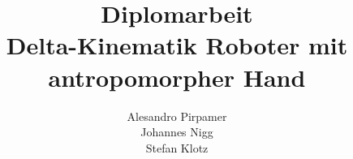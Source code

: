 \documentclass[a4paper,12pt,times,numbered,print,index]{Classes/PhDThesisPSnPDF}
\title{\Huge Diplomarbeit \\ \vspace{5 mm} {\Large Delta-Kinematik Roboter mit antropomorpher Hand}}
\author{Alesandro Pirpamer \\ Johannes Nigg \\ Stefan Klotz}
\begin{document}
\frontmatter


\begin{titlepage}

\maketitle

\end{titlepage}



 




\tableofcontents

\listoffigures

\listoftables 

\printnomencl

\mainmatter










\begin{appendices} %




\end{appendices}

\backmatter 

\begin{spacing}{0.9}




\cleardoublepage


\end{spacing}

\printthesisindex %
\end{document}
